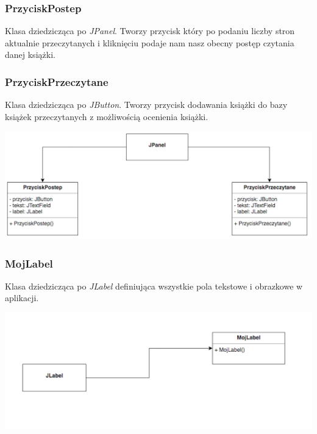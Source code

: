\documentclass[a4paper,10pt]{article}
\begin{document}
\begin{enumerate}
\subsubsection{PrzyciskPostep}
Klasa dziedzicząca po \textit{JPanel}. Tworzy przycisk który po podaniu liczby stron aktualnie przeczytanych i kliknięciu podaje nam nasz obecny postęp czytania danej książki.

\subsubsection{PrzyciskPrzeczytane}
Klasa dziedzicząca po \textit{JButton}. Tworzy przycisk dodawania książki do bazy książek przeczytanych z możliwością ocenienia książki.

\begin{center}
\includegraphics[scale=0.18]{UML5.png}
\end{center}

\subsubsection{MojLabel}
Klasa dziedzicząca po \textit{JLabel} definiująca wszystkie pola tekstowe i obrazkowe w aplikacji.

\begin{center}
\includegraphics[scale=0.18]{UML6.png}
\end{center}


\end{enumerate}
\end{document}
